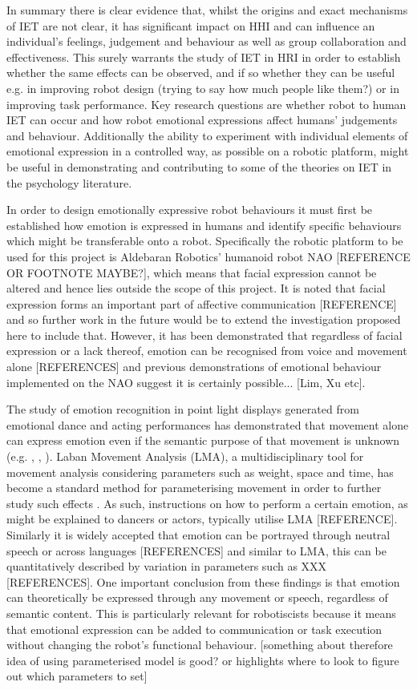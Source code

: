 \documentclass[11pt]{article}
\begin{document}
In summary there is clear evidence that, whilst the origins and exact mechanisms of IET are not clear, it has significant impact on HHI and can influence an individual's feelings, judgement and behaviour as well as group collaboration and effectiveness. This surely warrants the study of IET in HRI in order to establish whether the same effects can be observed, and if so whether they can be useful e.g. in improving robot design (trying to say how much people like them?) or in improving task performance. Key research questions are whether robot to human IET can occur and how robot emotional expressions affect humans' judgements and behaviour. Additionally the ability to experiment with individual elements of emotional expression in a controlled way, as possible on a robotic platform, might be useful in demonstrating and contributing to some of the theories on IET in the psychology literature. 

In order to design emotionally expressive robot behaviours it must first be established how emotion is expressed in humans and identify specific behaviours which might be transferable onto a robot. Specifically the robotic platform to be used for this project is Aldebaran Robotics' humanoid robot
NAO [REFERENCE OR FOOTNOTE MAYBE?], which means that facial expression cannot be altered and hence lies outside the scope of this project. It is noted that facial expression forms an important part of affective communication [REFERENCE] and so further work in the future would be to extend the investigation proposed here to include that. However, it has been demonstrated that regardless of facial expression or a lack thereof, emotion can be recognised from voice and movement alone [REFERENCES] and previous demonstrations of emotional behaviour implemented on the NAO suggest it is certainly possible... [Lim, Xu etc]. 

The study of emotion recognition in point light displays generated from emotional dance and acting performances has demonstrated that movement alone can express emotion even if the semantic purpose of that movement is unknown (e.g. \cite{dittrich1996perception}, \cite{pollick2001perceiving}, \cite{atkinson2004emotion}). Laban Movement Analysis (LMA), a multidisciplinary tool for movement analysis considering parameters such as weight, space and time, has become a standard method for parameterising movement in order to further study such effects \cite{lab2011}. As such, instructions on how to perform a certain emotion, as might be explained to dancers or actors, typically utilise LMA [REFERENCE]. Similarly it is widely accepted that emotion can be portrayed through neutral speech or across languages [REFERENCES] and similar to LMA, this can be quantitatively described by variation in parameters such as XXX [REFERENCES]. One important conclusion from these findings is that emotion can theoretically be expressed through any movement or speech, regardless of semantic content. This is particularly relevant for robotiscists because it means that emotional expression can be added to communication or task execution without changing the robot's functional behaviour. [something about therefore idea of using parameterised model is good? or highlights where to look to figure out which parameters to set]
\end{document}
